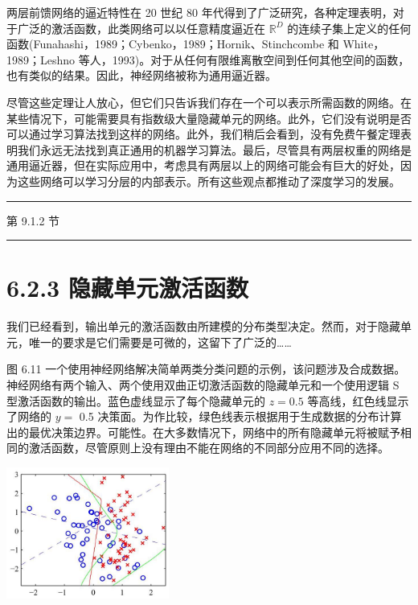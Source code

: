 \documentclass[10pt]{report}
\newcommand{\HRule}{\begin{center}\rule{0.9\linewidth}{0.2mm}\end{center}}
\begin{document}
两层前馈网络的逼近特性在 20 世纪 80 年代得到了广泛研究，各种定理表明，对于广泛的激活函数，此类网络可以以任意精度逼近在 \({\mathbb{R}}^{D}\) 的连续子集上定义的任何函数(Funahashi，1989；Cybenko，1989；Hornik、Stinchcombe 和 White，1989；Leshno 等人，1993)。对于从任何有限维离散空间到任何其他空间的函数，也有类似的结果。因此，神经网络被称为通用逼近器。

尽管这些定理让人放心，但它们只告诉我们存在一个可以表示所需函数的网络。在某些情况下，可能需要具有指数级大量隐藏单元的网络。此外，它们没有说明是否可以通过学习算法找到这样的网络。此外，我们稍后会看到，没有免费午餐定理表明我们永远无法找到真正通用的机器学习算法。最后，尽管具有两层权重的网络是通用逼近器，但在实际应用中，考虑具有两层以上的网络可能会有巨大的好处，因为这些网络可以学习分层的内部表示。所有这些观点都推动了深度学习的发展。

\HRule

第 9.1.2 节

\HRule

\section*{6.2.3 隐藏单元激活函数}

我们已经看到，输出单元的激活函数由所建模的分布类型决定。然而，对于隐藏单元，唯一的要求是它们需要是可微的，这留下了广泛的……

图 6.11 一个使用神经网络解决简单两类分类问题的示例，该问题涉及合成数据。神经网络有两个输入、两个使用双曲正切激活函数的隐藏单元和一个使用逻辑 S 型激活函数的输出。蓝色虚线显示了每个隐藏单元的 \(z = {0.5}\) 等高线，红色线显示了网络的 \(y =\) 0.5 决策面。为作比较，绿色线表示根据用于生成数据的分布计算出的最优决策边界。可能性。在大多数情况下，网络中的所有隐藏单元将被赋予相同的激活函数，尽管原则上没有理由不能在网络的不同部分应用不同的选择。

\begin{center}
\includegraphics[max width=0.4\textwidth]{images/0194e279-9b28-703a-88f4-c3ac21e2010d_202_944_359_570_460_0.jpg}
\end{center}
\hspace*{3em} 
\end{document}
